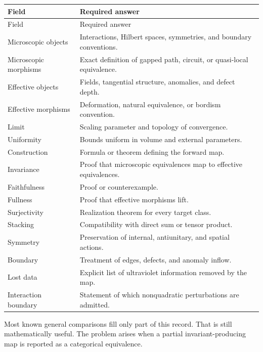 \documentclass[12pt]{article}
\theoremstyle{definition}
\theoremstyle{remark}
\begin{document}
\begin{longtable}{p{}p{}}
\toprule
Field & Required answer \\
\midrule
\endfirsthead
\toprule
Field & Required answer \\
\midrule
\endhead
Microscopic objects & Interactions, Hilbert spaces, symmetries, and boundary conventions.\\
Microscopic morphisms & Exact definition of gapped path, circuit, or quasi-local equivalence.\\
Effective objects & Fields, tangential structure, anomalies, and defect depth.\\
Effective morphisms & Deformation, natural equivalence, or bordism convention.\\
Limit & Scaling parameter and topology of convergence.\\
Uniformity & Bounds uniform in volume and external parameters.\\
Construction & Formula or theorem defining the forward map.\\
Invariance & Proof that microscopic equivalences map to effective equivalences.\\
Faithfulness & Proof or counterexample.\\
Fullness & Proof that effective morphisms lift.\\
Surjectivity & Realization theorem for every target class.\\
Stacking & Compatibility with direct sum or tensor product.\\
Symmetry & Preservation of internal, antiunitary, and spatial actions.\\
Boundary & Treatment of edges, defects, and anomaly inflow.\\
Lost data & Explicit list of ultraviolet information removed by the map.\\
Interaction boundary & Statement of which nonquadratic perturbations are admitted.\\
\bottomrule
\end{longtable}

Most known general comparisons fill only part of this record.
That is still mathematically useful.
The problem arises when a partial invariant-producing map is reported as a
categorical equivalence.
\end{document}
